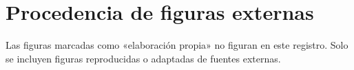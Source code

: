 
\section*{Procedencia de figuras externas}
\label{sec:procedencia-figuras}

Las figuras marcadas como «elaboración propia» no figuran
en este registro. Solo se incluyen figuras reproducidas o
adaptadas de fuentes externas.

\bigskip



